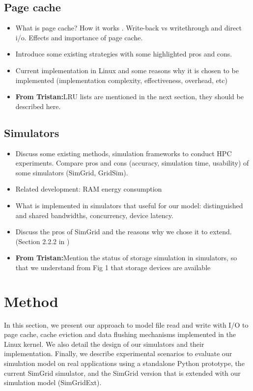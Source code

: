 \documentclass[conference]{IEEEtran}
\newcommand{\tristan}[1]{\color{orange}\textbf{From Tristan:}#1\color{black}}
\begin{document}
		\subsection{Page cache}
			\begin{itemize}
				\item What is page cache? How it works \cite{linuxdev3rd2010}. 
				Write-back vs writethrough and direct i/o. Effects and importance of page cache.
				\item Introduce some existing strategies with some highlighted pros and cons.
				\item Current implementation in Linux and some reasons why it is chosen to be implemented (implementation complexity, effectiveness, overhead, etc) \cite{linuxdev3rd2010}
				\item \tristan{LRU lists are mentioned in the next section, they should be described here.}
			\end{itemize}									

		\subsection{Simulators}
			\begin{itemize}
				\item Discuss some existing methods, simulation frameworks to conduct HPC experiments. Compare pros and cons (accuracy, simulation time, usability) of some simulators (SimGrid, GridSim).
				\item Related development: RAM energy consumption \cite{gill2019} \cite{ouarnoughi2017} 
				\item What is implemented in simulators that useful for our model:
				distinguished and shared bandwidths, concurrency, device latency. 
				\item Discuss the pros of SimGrid and the reasons why we chose it to extend. (Section 2.2.2 in \cite{simgrid2014})
				\item \tristan{Mention the status of storage simulation in simulators, so that we understand from Fig 1 that storage devices are available}
			\end{itemize}
			
	\section{Method}

		In this section, we present our approach to model file read and write with
		I/O to page cache, cache eviction and data flushing mechanisms implemented 
		in the Linux kernel. We also detail the design of our simulators and their
		implementation. Finally, we describe experimental scenarios to evaluate
		our simulation model on real applications using a standalone Python
		prototype, the current SimGrid simulator, and the SimGrid version that is 
		extended with our simulation model (SimGridExt).
\end{document}
